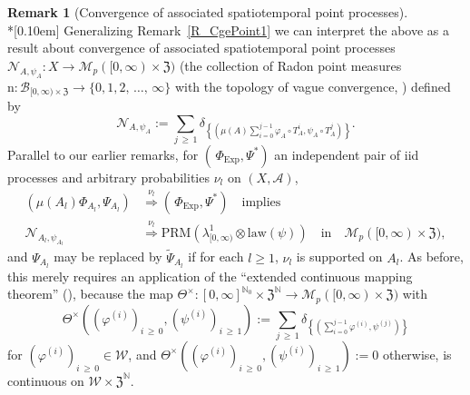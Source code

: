 \documentclass[10pt]{amsart}
\theoremstyle{definition}\newtheorem{defi}[theo]{Definition}\newtheorem{rema}[theo]{Remark}\newtheorem{exam}[theo]{Example}\newtheorem{exem}[theo]{Example}\newtheorem{nota}[theo]{Notation}
\newcommand{\clA}{\mathcal{A}}
\newcommand{\clB}{\mathcal{B}}
\newcommand{\clM}{\mathcal{M}}
\newcommand{\clW}{\mathcal{W}}
\newcommand{\clN}{\mathcal{N}}
\newcommand{\Expl}{\mathrm{Exp}}
\newcommand{\law}{\mathrm{law}}
\newcommand{\PRM}{\mathrm{PRM}}
\newcommand{\rmnn}{\mathrm{n}}
\newcommand{\frkZ}{\mathfrak{Z}}
\newcommand{\bbN}{\mathbb{N}}
\begin{document}
\pagebreak

\begin{rema}[{Convergence of associated spatiotemporal point processes}]\label{R_CgeSpatoiTempPoint1}\ \\*[0.10em]
Generalizing Remark~\ref{R_CgePoint1} we can interpret the above as a result about convergence of associated spatiotemporal point processes $\clN_{A,\psi_{A}}:X\rightarrow\clM_{p}([0,\infty)\times\frkZ)$ (the collection of Radon point measures $\rmnn:\clB_{[0,\infty)\times\frkZ}\rightarrow
\{0,1,2,\,\ldots,\,\infty\}$ with the topology of vague convergence, \cite{Resnick}) defined by
\begin{equation}
\clN_{A,\psi_{A}}:= {\sum_{j\,\geq\,1}}
\delta_{\left\{\left(\mu(A)\sum\limits_{i=0}^{j-1}\varphi_{A}\circ T_{A}^{i},\psi_{A}\circ T_{A}^{j}\right)\right\}}.
\end{equation}
Parallel to our earlier remarks, for $(\,\Phi_{\Expl},\Psi^{\ast})$ an independent pair of iid processes and arbitrary probabilities $\nu_{l}$ on $(X,\clA)$,
\begin{equation}
\begin{split}
(\mu(A_{l})\Phi_{A_{l}},\Psi_{A_{l}}) &\overset{\nu_{l}}{\Longrightarrow} (\,\Phi_{\Expl},\Psi^{\ast})\quad\text{implies}\\
\clN_{A_{l},\psi_{A_{l}}} &\overset{\nu_{l}}{\Longrightarrow}
\PRM(\lambda_{\lbrack0,\infty)}^{1}\otimes\law(\psi))\quad\text{in}\quad\clM_{p}([0,\infty)\times\frkZ),
\end{split}
\end{equation}
and $\Psi_{A_{l}}$ may be replaced by $\widetilde{\Psi}_{A_{l}}$ if for each $l\geq1$, $\nu_{l}$ is supported on $A_{l}$. As before, this merely requires an application of the ``extended continuous mapping theorem'' (\cite[Theorem~2.7]{Bi}), because the map $\Theta^{\times}:[0,\infty]^{\bbN_{0}}\times\frkZ^{\bbN }\rightarrow\clM_{p}([0,\infty)\times\frkZ)$ with 
\[
\Theta ^{\times}\left(\left(\varphi^{(i)}\right)_{i\,\geq\,0},\left(\psi^{(i)}\right)_{i\,\geq\,1}\right):= {\sum_{j\,\geq\,1}}
\delta_{\left\{\left(\sum\limits_{i=0}^{j-1}\varphi^{(i)},\psi^{(j)}\right)\right\}}
\]
for $(\varphi ^{(i)})_{i\,\geq\,0}\in\clW$, and $\Theta^{\times}((\varphi^{(i)})_{i\,\geq\,0},(\psi^{(i)})_{i\,\geq\,1}):=0$ otherwise, is continuous on $\clW
\times\frkZ^{\bbN}$.
\end{rema}
\end{document}

